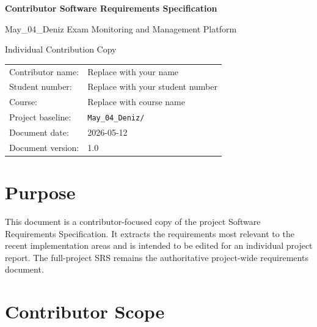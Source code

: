 \documentclass[12pt,a4paper]{article}
\begin{document}
\begin{titlepage}
    \centering
    \vspace*{2cm}
    {\Huge\bfseries Contributor Software Requirements Specification\par}
    \vspace{0.6cm}
    {\Large May\_04\_Deniz Exam Monitoring and Management Platform\par}
    \vspace{1.5cm}
    {\large Individual Contribution Copy\par}
    \vfill
    \begin{tabular}{ll}
        Contributor name: & Replace with your name \\
        Student number: & Replace with your student number \\
        Course: & Replace with course name \\
        Project baseline: & \texttt{May\_04\_Deniz/} \\
        Document date: & 2026-05-12 \\
        Document version: & 1.0 \\
    \end{tabular}
    \vfill
\end{titlepage}

\tableofcontents
\newpage

\section{Purpose}

This document is a contributor-focused copy of the project Software
Requirements Specification. It extracts the requirements most relevant to the
recent implementation areas and is intended to be edited for an individual
project report. The full-project SRS remains the authoritative project-wide
requirements document.

\section{Contributor Scope}
\end{document}
